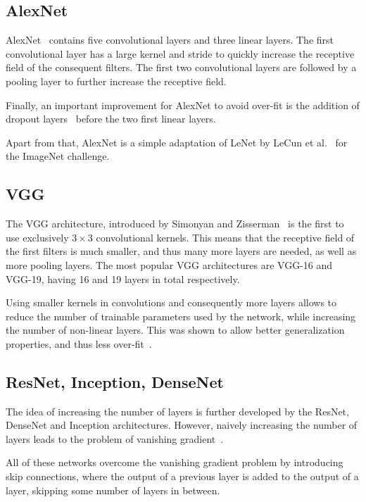 \subsection{AlexNet}
AlexNet~\cite{krizhevsky_imagenet_2012} contains five convolutional
layers and three linear layers. The first convolutional layer
has a large kernel and stride to quickly increase the receptive field
of the consequent filters. The first two convolutional layers are followed
by a pooling layer to further increase the receptive field.

Finally, an important improvement for AlexNet to avoid over-fit is
the addition of dropout layers~\cite{hinton_improving_2012} before the
two first linear layers.

Apart from that, AlexNet is a simple adaptation of LeNet by
LeCun et al.~\cite{lecun_gradient-based_1998} for the ImageNet challenge.

\subsection{VGG}
The VGG architecture, introduced by
Simonyan and Zisserman~\cite{simonyan_very_2014}
is the first to use exclusively $3\times3$ convolutional kernels.
This means that the receptive field of the
first filters is much smaller, and thus many more layers are needed,
as well as more pooling layers. The most popular VGG architectures
are VGG-16 and VGG-19, having 16 and 19 layers in total respectively.

Using smaller kernels in convolutions and consequently more layers
allows to reduce the number of trainable parameters used by the
network, while increasing the number of non-linear layers.
This was shown to allow better generalization properties, and thus less
over-fit~\cite{simonyan_very_2014}.

\subsection{ResNet, Inception, DenseNet}
The idea of increasing the number of layers is further developed
by the ResNet, DenseNet and Inception architectures. However,
naively increasing the number of layers leads to the problem of
vanishing gradient~\cite{hinton_fast_2006}.

All of these networks overcome the vanishing gradient problem by
introducing skip connections, where the output of a previous layer
is added to the output of a layer, skipping some number of layers in
between.

